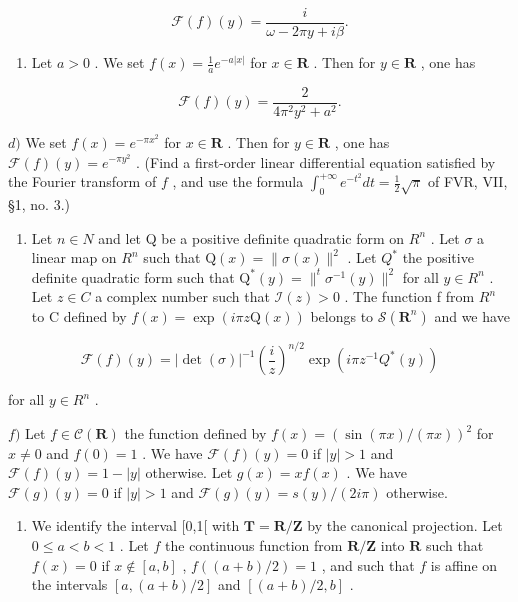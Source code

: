 \[
\mathcal {F} (f) (y) = \frac {i}{\omega - 2 \pi y + i \beta}.
\]

\begin{enumerate}
\def\labelenumi{\alph{enumi})}
\setcounter{enumi}{2}
\tightlist
\item
  Let \(a > 0\) . We set \(f(x) = \frac{1}{a} e^{-a|x|}\) for \(x \in \mathbf{R}\) . Then for \(y \in \mathbf{R}\) , one has
\end{enumerate}

\[
\mathcal {F} (f) (y) = \frac {2}{4 \pi^ {2} y ^ {2} + a ^ {2}}.
\]

\(d)\) We set \(f(x) = e^{-\pi x^2}\) for \(x \in \mathbf{R}\) . Then for \(y \in \mathbf{R}\) , one has \(\mathcal{F}(f)(y) = e^{-\pi y^2}\) . (Find a first-order linear differential equation satisfied by the Fourier transform of \(f\) , and use the formula \(\int_0^{+\infty} e^{-t^2} dt = \frac{1}{2} \sqrt{\pi}\) of FVR, VII, §1, no. 3.)

\begin{enumerate}
\def\labelenumi{\alph{enumi})}
\setcounter{enumi}{4}
\tightlist
\item
  Let \(n \in N\) and let Q be a positive definite quadratic form on \(R^{n}\) . Let \(\sigma\) a linear map on \(R^{n}\) such that \(\mathrm{Q}(x) = \| \sigma(x) \|^{2}\) . Let \(Q^{*}\) the positive definite quadratic form such that \(\mathrm{Q}^{*}(y) = \|^{t} \sigma^{-1}(y) \|^{2}\) for all \(y \in R^{n}\) . Let \(z \in C\) a complex number such that \(\mathcal{I}(z) > 0\) . The function f from \(R^{n}\) to C defined by \(f(x) = \exp(i\pi z\mathrm{Q}(x))\) belongs to \(\mathcal{S}(\mathbf{R}^{n})\) and we have
\end{enumerate}

\[
\mathscr {F} (f) (y) = | \det (\sigma) | ^ {- 1} \left(\frac {i}{z}\right) ^ {n / 2} \exp (i \pi z ^ {- 1} Q ^ {*} (y))
\]

for all \(y \in R^{n}\) .

\(f)\) Let \(f \in \mathcal{C}(\mathbf{R})\) the function defined by \(f(x) = (\sin(\pi x)/(\pi x))^2\) for \(x \neq 0\) and \(f(0) = 1\) . We have \(\mathcal{F}(f)(y) = 0\) if \(|y| > 1\) and \(\mathcal{F}(f)(y) = 1 - |y|\) otherwise. Let \(g(x) = xf(x)\) . We have \(\mathcal{F}(g)(y) = 0\) if \(|y| > 1\) and \(\mathcal{F}(g)(y) = s(y)/(2i\pi)\) otherwise.

\begin{enumerate}
\def\labelenumi{\arabic{enumi})}
\setcounter{enumi}{1}
\tightlist
\item
  We identify the interval {[}0,1{[} with \(\mathbf{T} = \mathbf{R} / \mathbf{Z}\) by the canonical projection. Let \(0 \leqslant a < b < 1\) . Let \(f\) the continuous function from \(\mathbf{R} / \mathbf{Z}\) into \(\mathbf{R}\) such that \(f(x) = 0\) if \(x \notin [a,b]\) , \(f((a + b) / 2) = 1\) , and such that \(f\) is affine on the intervals \([a, (a + b) / 2]\) and \([(a + b) / 2, b]\) .
\end{enumerate}


